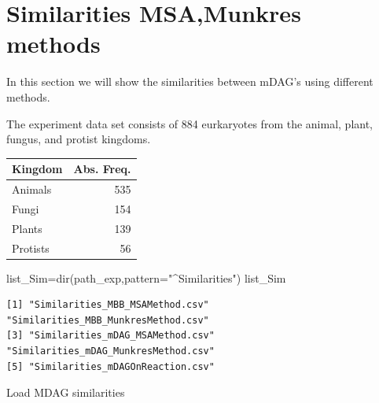 \documentclass[
  letterpaper,
  DIV=11,
  numbers=noendperiod]{scrreprt}
\newenvironment{Shaded}{\begin{snugshade}}{\end{snugshade}}
\newcommand{\AttributeTok}[1]{\textcolor[rgb]{0.40,0.45,0.13}{#1}}
\newcommand{\DecValTok}[1]{\textcolor[rgb]{0.68,0.00,0.00}{#1}}
\newcommand{\FunctionTok}[1]{\textcolor[rgb]{0.28,0.35,0.67}{#1}}
\newcommand{\NormalTok}[1]{\textcolor[rgb]{0.00,0.23,0.31}{#1}}
\newcommand{\OtherTok}[1]{\textcolor[rgb]{0.00,0.23,0.31}{#1}}
\newcommand{\SpecialCharTok}[1]{\textcolor[rgb]{0.37,0.37,0.37}{#1}}
\newcommand{\StringTok}[1]{\textcolor[rgb]{0.13,0.47,0.30}{#1}}
\begin{document}

\hypertarget{similarities-msamunkres-methods}{%
\chapter*{Similarities MSA,Munkres
methods}\label{similarities-msamunkres-methods}}


In this section we will show the similarities between mDAG's using
different methods.

The experiment data set consists of 884 eurkaryotes from the animal,
plant, fungus, and protist kingdoms.

\begin{tabular}{l|r}
\hline
Kingdom & Abs. Freq.\\
\hline
Animals & 535\\
\hline
Fungi & 154\\
\hline
Plants & 139\\
\hline
Protists & 56\\
\hline
\end{tabular}

\begin{Shaded}
\begin{Highlighting}[]
\NormalTok{list\_Sim}\OtherTok{=}\FunctionTok{dir}\NormalTok{(path\_exp,}\AttributeTok{pattern=}\StringTok{"\^{}Similarities"}\NormalTok{)}
\NormalTok{list\_Sim}
\end{Highlighting}
\end{Shaded}

\begin{verbatim}
[1] "Similarities_MBB_MSAMethod.csv"      "Similarities_MBB_MunkresMethod.csv" 
[3] "Similarities_mDAG_MSAMethod.csv"     "Similarities_mDAG_MunkresMethod.csv"
[5] "Similarities_mDAGOnReaction.csv"    
\end{verbatim}

Load MDAG similarities

\begin{Shaded}
\end{Shaded}
\end{document}
